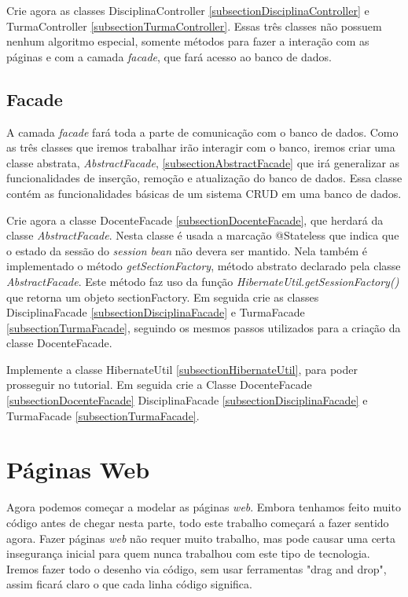 \documentclass[12pt,a4paper]{article}
\begin{document}
Crie agora as classes DisciplinaController \ref{subsectionDisciplinaController} e TurmaController \ref{subsectionTurmaController}. Essas três classes não possuem nenhum algoritmo especial, somente métodos para fazer a interação com as páginas e com a camada \textit{facade}, que fará acesso ao banco de dados.


\subsection{Facade}
A camada \textit{facade} fará toda a parte de comunicação com o banco de dados. Como as três classes que iremos trabalhar irão interagir com o banco, iremos criar uma classe abstrata, \textit{AbstractFacade}, \ref{subsectionAbstractFacade} que irá generalizar as funcionalidades de inserção, remoção e atualização do banco de dados. Essa classe contém as funcionalidades básicas de um sistema CRUD em uma banco de dados.


 Crie agora a classe DocenteFacade \ref{subsectionDocenteFacade}, que herdará da classe \textit{AbstractFacade}. Nesta classe é usada a marcação @Stateless que indica que o estado da sessão do \textit{session bean} não devera ser mantido. Nela também é implementado o método \textit{getSectionFactory}, método abstrato declarado pela classe \textit{AbstractFacade}. Este método faz uso da função \textit{HibernateUtil.getSessionFactory()} que retorna um objeto sectionFactory. Em seguida crie as classes DisciplinaFacade \ref{subsectionDisciplinaFacade} e TurmaFacade \ref{subsectionTurmaFacade}, seguindo os mesmos passos utilizados para a criação da classe DocenteFacade.
 
 Implemente a classe HibernateUtil \ref{subsectionHibernateUtil}, para poder prosseguir no tutorial.
 Em seguida crie a Classe DocenteFacade \ref{subsectionDocenteFacade} DisciplinaFacade \ref{subsectionDisciplinaFacade} e TurmaFacade \ref{subsectionTurmaFacade}.

\newpage
\section{Páginas Web}

Agora podemos começar a modelar as páginas \textit{web}. Embora tenhamos feito muito código antes de chegar nesta parte, todo este trabalho começará a fazer sentido agora.
Fazer páginas \textit{web} não requer muito trabalho, mas pode causar uma certa insegurança inicial para quem nunca trabalhou com este tipo de tecnologia. Iremos fazer todo o desenho via código, sem usar ferramentas "drag and drop", assim ficará claro o que cada linha código significa. \\
\end{document}
